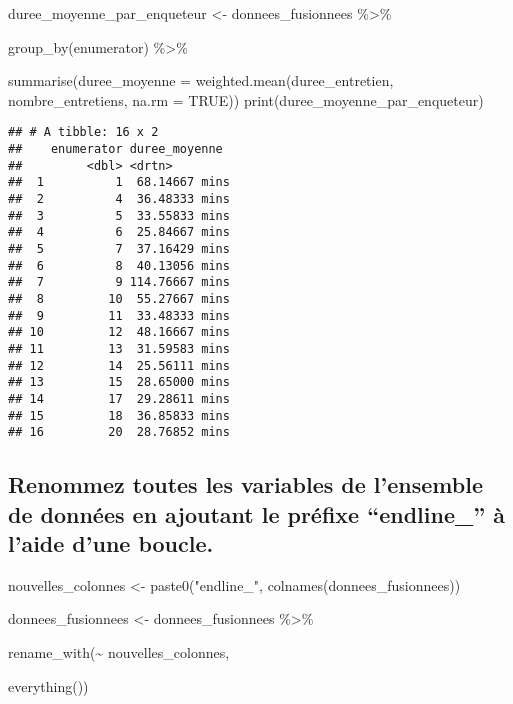 \documentclass[
  14pt,
]{article}
\newenvironment{Shaded}{\begin{snugshade}}{\end{snugshade}}
\newcommand{\AttributeTok}[1]{\textcolor[rgb]{0.77,0.63,0.00}{#1}}
\newcommand{\ConstantTok}[1]{\textcolor[rgb]{0.00,0.00,0.00}{#1}}
\newcommand{\FunctionTok}[1]{\textcolor[rgb]{0.00,0.00,0.00}{#1}}
\newcommand{\NormalTok}[1]{#1}
\newcommand{\OtherTok}[1]{\textcolor[rgb]{0.56,0.35,0.01}{#1}}
\newcommand{\SpecialCharTok}[1]{\textcolor[rgb]{0.00,0.00,0.00}{#1}}
\newcommand{\StringTok}[1]{\textcolor[rgb]{0.31,0.60,0.02}{#1}}
\begin{document}
\begin{Shaded}
\begin{Highlighting}[]
\NormalTok{duree\_moyenne\_par\_enqueteur }\OtherTok{\textless{}{-}}\NormalTok{ donnees\_fusionnees }\SpecialCharTok{\%\textgreater{}\%}
  
  \FunctionTok{group\_by}\NormalTok{(enumerator) }\SpecialCharTok{\%\textgreater{}\%}
  
  \FunctionTok{summarise}\NormalTok{(}\AttributeTok{duree\_moyenne =} \FunctionTok{weighted.mean}\NormalTok{(duree\_entretien,}
\NormalTok{                                          nombre\_entretiens,}
                                          \AttributeTok{na.rm =} \ConstantTok{TRUE}\NormalTok{)) }
\FunctionTok{print}\NormalTok{(duree\_moyenne\_par\_enqueteur)}
\end{Highlighting}
\end{Shaded}

\begin{verbatim}
## # A tibble: 16 x 2
##    enumerator duree_moyenne 
##         <dbl> <drtn>        
##  1          1  68.14667 mins
##  2          4  36.48333 mins
##  3          5  33.55833 mins
##  4          6  25.84667 mins
##  5          7  37.16429 mins
##  6          8  40.13056 mins
##  7          9 114.76667 mins
##  8         10  55.27667 mins
##  9         11  33.48333 mins
## 10         12  48.16667 mins
## 11         13  31.59583 mins
## 12         14  25.56111 mins
## 13         15  28.65000 mins
## 14         17  29.28611 mins
## 15         18  36.85833 mins
## 16         20  28.76852 mins
\end{verbatim}

\hypertarget{renommez-toutes-les-variables-de-lensemble-de-donnuxe9es-en-ajoutant-le-pruxe9fixe-endline_-uxe0-laide-dune-boucle.}{%
\subsection{\texorpdfstring{\textbf{Renommez toutes les variables de
l'ensemble de données en ajoutant le préfixe ``endline\_'' à l'aide
d'une boucle.}\\
}{Renommez toutes les variables de l'ensemble de données en ajoutant le préfixe ``endline\_'' à l'aide d'une boucle. }}\label{renommez-toutes-les-variables-de-lensemble-de-donnuxe9es-en-ajoutant-le-pruxe9fixe-endline_-uxe0-laide-dune-boucle.}}

\begin{Shaded}
\begin{Highlighting}[]
\NormalTok{nouvelles\_colonnes }\OtherTok{\textless{}{-}} \FunctionTok{paste0}\NormalTok{(}\StringTok{"endline\_"}\NormalTok{,}
                             \FunctionTok{colnames}\NormalTok{(donnees\_fusionnees))}

\NormalTok{donnees\_fusionnees }\OtherTok{\textless{}{-}}\NormalTok{ donnees\_fusionnees }\SpecialCharTok{\%\textgreater{}\%}
  
  \FunctionTok{rename\_with}\NormalTok{(}\SpecialCharTok{\textasciitilde{}}\NormalTok{ nouvelles\_colonnes, }
              
              \FunctionTok{everything}\NormalTok{())}
\end{Highlighting}
\end{Shaded}
\end{document}
